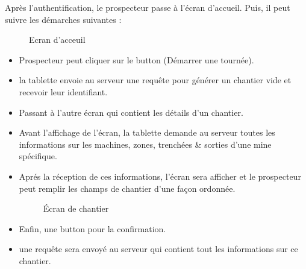 Apr\`es l'authentification, le prospecteur passe \`a l'\'ecran d'accueil. Puis, il peut suivre les d\'emarches suivantes :
\begin{figure}[H]
	\caption{\label{fig:my-label} Ecran d'acceuil}
\end{figure}
\begin{itemize}
\item Prospecteur peut cliquer sur le button (D\'emarrer une tourn\'ee).
\item la tablette envoie au serveur une requ\^ete pour g\'en\'erer un chantier vide et recevoir leur identifiant.
\item Passant \`a l'autre \'ecran qui contient les d\'etails d'un chantier.
\item Avant l'affichage de l'\'ecran, la tablette demande au serveur toutes les informations sur les machines, zones, trench\'ees \& sorties d'une mine sp\'ecifique.
\item Apr\'es la r\'eception de ces informations, l'\'ecran sera afficher et le prospecteur peut remplir les champs de chantier d'une fa\c{c}on ordonn\'ee.
\begin{figure}[H]
	\caption{\label{fig:my-label} \'Ecran de chantier}
\end{figure}
\item Enfin, une button pour la  confirmation.
\item une requ\^ete sera envoy\'e au serveur qui contient tout les informations sur ce chantier.
\end{itemize} 

